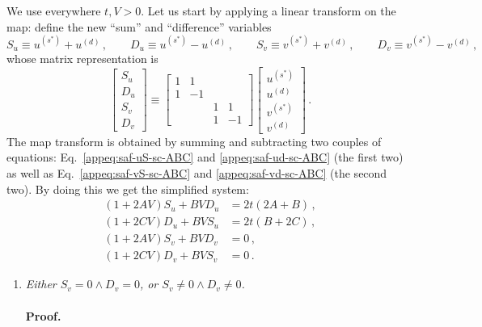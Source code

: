 \begin{tabproof}
	
We use everywhere $t,V > 0$. Let us start by applying a linear transform on the map: define the new ``sum'' and ``difference'' variables
\[
	S_u \equiv u^{(s^*)} + u^{(d)} \, ,
	\qquad
	D_u \equiv u^{(s^*)} - u^{(d)} \, ,
	\qquad
	S_v \equiv v^{(s^*)} + v^{(d)} \, ,
	\qquad
	D_v \equiv v^{(s^*)} - v^{(d)} \, ,
\]
whose matrix representation is
\[
\begin{bmatrix}
	S_u \\ D_u \\ S_v \\ D_v
\end{bmatrix} \equiv \begin{bmatrix}
	1 & 1 && \\
	1 & -1 && \\
	&& 1 & 1 \\
	&& 1 & -1
\end{bmatrix} \begin{bmatrix}
	u^{(s^*)} \\ u^{(d)} \\ v^{(s^*)} \\ v^{(d)}
\end{bmatrix} \, .
\]
The map transform is obtained by summing and subtracting two couples of equations: Eq.~\eqref{appeq:saf-uS-sc-ABC} and \eqref{appeq:saf-ud-sc-ABC} (the first two) as well as Eq.~\eqref{appeq:saf-vS-sc-ABC} and \eqref{appeq:saf-vd-sc-ABC} (the second two). By doing this we get the simplified system:
\begin{align}
	(1+2AV) S_u + BV D_u &= 2t(2A+B) \, , \label{appeq:saf-Su-sc-ABC} \\
	(1+2CV) D_u + BV S_u &= 2t(B+2C) \, , \label{appeq:saf-Du-sc-ABC} \\
	(1+2AV) S_v + BV D_v &= 0 \, , \label{appeq:saf-Sv-sc-ABC} \\
	(1+2CV) D_v + BV S_v &= 0 \, . \label{appeq:saf-Dv-sc-ABC}
\end{align}
	
\begin{enumerate}
	\item \textit{Either $S_v = 0 \land D_v = 0$, or $S_v \neq 0 \land D_v \neq 0$.}
	
	\paragraph{Proof.}
	

\end{enumerate}
\end{tabproof}
